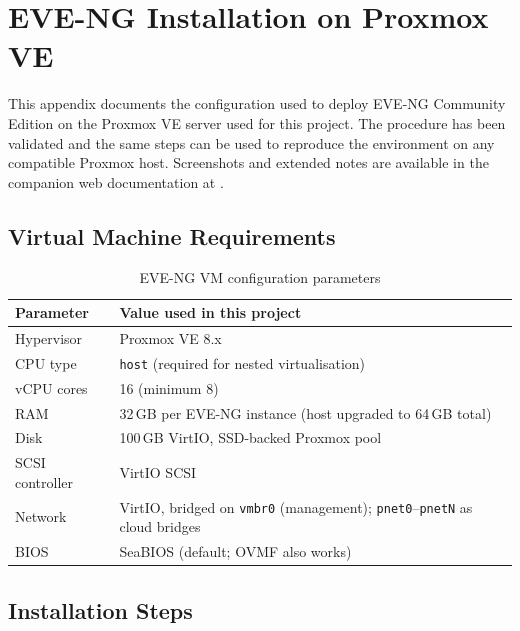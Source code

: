 
\chapter{EVE-NG Installation on Proxmox VE}
\label{app:eve-setup}

This appendix documents the configuration used to deploy EVE-NG Community Edition
on the Proxmox VE server used for this project. The procedure has been validated and
the same steps can be used to reproduce the environment on any compatible Proxmox
host. Screenshots and extended notes are available in the companion web documentation
at .

\section*{Virtual Machine Requirements}

\begin{table}[H]
\centering
\begin{tabularx}{\textwidth}{lX}
\toprule
\textbf{Parameter} & \textbf{Value used in this project} \\
\midrule
Hypervisor        & Proxmox VE 8.x \\
CPU type          & \texttt{host} (required for nested virtualisation) \\
vCPU cores        & 16 (minimum 8) \\
RAM               & 32\,GB per EVE-NG instance (host upgraded to 64\,GB total) \\
Disk              & 100\,GB VirtIO, SSD-backed Proxmox pool \\
SCSI controller   & VirtIO SCSI \\
Network           & VirtIO, bridged on \texttt{vmbr0} (management); \texttt{pnet0}--\texttt{pnetN} as cloud bridges \\
BIOS              & SeaBIOS (default; OVMF also works) \\
\bottomrule
\end{tabularx}
\caption{EVE-NG VM configuration parameters}
\label{tab:eve-vm-params}
\end{table}

\section*{Installation Steps}

